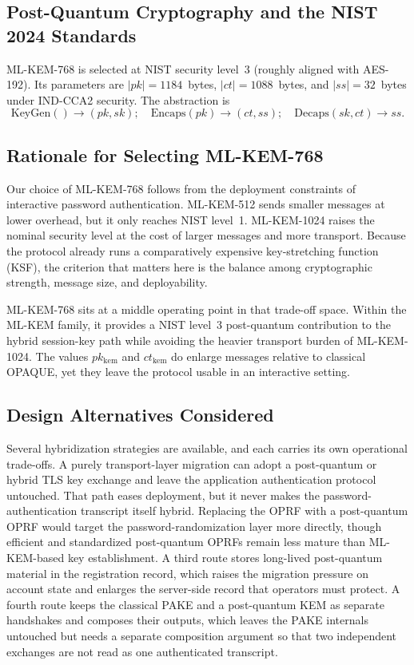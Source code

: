 \documentclass[preprint,12pt]{elsarticle}
\theoremstyle{remark}
\begin{document}
\subsection{Post-Quantum Cryptography and the NIST 2024 Standards}

ML-KEM-768 is selected at NIST security level~3 (roughly aligned with
AES-192). Its parameters are $|pk| = 1184$~bytes,
$|ct| = 1088$~bytes, and $|ss| = 32$~bytes under IND-CCA2 security.
The abstraction is
\begin{equation}
  \mathrm{KeyGen}() \to (pk, sk);\quad
  \mathrm{Encaps}(pk) \to (ct, ss);\quad
  \mathrm{Decaps}(sk, ct) \to ss.
\end{equation}

\subsection{Rationale for Selecting ML-KEM-768}

Our choice of ML-KEM-768 follows from the deployment constraints of
interactive password authentication. ML-KEM-512 sends smaller messages
at lower overhead, but it only reaches NIST level~1. ML-KEM-1024 raises
the nominal security level at the cost of larger messages and more
transport. Because the protocol already runs a comparatively expensive
key-stretching function (KSF), the criterion that matters here is the balance among cryptographic
strength, message size, and deployability.

ML-KEM-768 sits at a middle operating point in that trade-off space.
Within the ML-KEM family, it provides a NIST level~3 post-quantum
contribution to the hybrid session-key path while avoiding
the heavier transport burden of ML-KEM-1024. The values
$pk_{\mathrm{kem}}$ and $ct_{\mathrm{kem}}$ do enlarge
messages relative to classical OPAQUE, yet they leave the protocol
usable in an interactive setting.

\subsection{Design Alternatives Considered}

Several hybridization strategies are available, and each carries its own
operational trade-offs. A purely transport-layer migration can adopt a
post-quantum or hybrid TLS key exchange and leave the application
authentication protocol untouched. That path eases deployment, but it
never makes the password-authentication transcript itself hybrid.
Replacing the OPRF with a post-quantum OPRF would target the
password-randomization layer more directly, though efficient and
standardized post-quantum OPRFs remain less mature than ML-KEM-based key
establishment. A third route stores long-lived post-quantum material in
the registration record, which raises the migration pressure on account
state and enlarges the server-side record that operators must protect.
A fourth route keeps the classical PAKE and a post-quantum KEM as
separate handshakes and composes their outputs, which leaves the PAKE
internals untouched but needs a separate composition argument so that
two independent exchanges are not read as one authenticated transcript.
\end{document}
